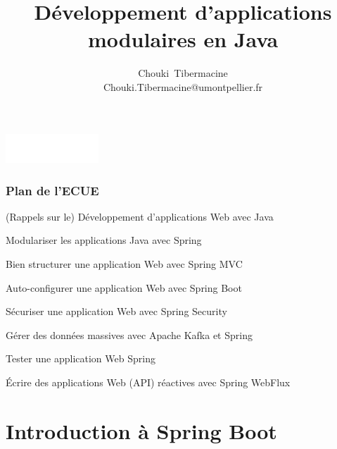 \documentclass{beamer}
\title[]{\Large{Développement d'applications modulaires en Java}}
\author[C. Tibermacine]{\large{Chouki~Tibermacine}\\
\small{Chouki.Tibermacine@umontpellier.fr}}
\date{\tiny{}}
\begin{document}
\begin{frame}
\titlepage
\begin{flushright}
\includegraphics[width=3.5cm]{figs/polytech.png}
\end{flushright}
\end{frame}

\begin{frame}
	\frametitle{Plan de l'ECUE}
	\begin{enumerate}
		{\color{gray} \item (Rappels sur le) Développement d'applications Web avec Java
		\item Modulariser les applications Java avec Spring
	\item Bien structurer une application Web avec Spring MVC}					
		\item Auto-configurer une application Web avec Spring Boot
	{\color{gray}
		\item Sécuriser une application Web avec Spring Security
		\item Gérer des données massives avec Apache Kafka et Spring
		\item Tester une application Web Spring
		\item Écrire des applications Web (API) réactives avec Spring WebFlux}
	\end{enumerate}
\end{frame}



\section{Introduction à Spring Boot}
\end{document}
